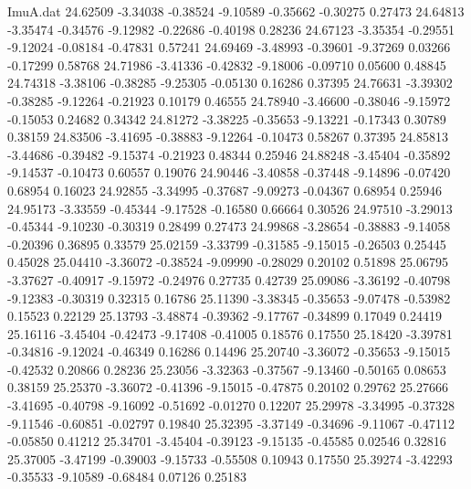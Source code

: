 \begin{filecontents}{ImuA.dat}
  24.62509   -3.34038   -0.38524   -9.10589   -0.35662   -0.30275    0.27473
  24.64813   -3.35474   -0.34576   -9.12982   -0.22686   -0.40198    0.28236
  24.67123   -3.35354   -0.29551   -9.12024   -0.08184   -0.47831    0.57241
  24.69469   -3.48993   -0.39601   -9.37269    0.03266   -0.17299    0.58768
  24.71986   -3.41336   -0.42832   -9.18006   -0.09710    0.05600    0.48845
  24.74318   -3.38106   -0.38285   -9.25305   -0.05130    0.16286    0.37395
  24.76631   -3.39302   -0.38285   -9.12264   -0.21923    0.10179    0.46555
  24.78940   -3.46600   -0.38046   -9.15972   -0.15053    0.24682    0.34342
  24.81272   -3.38225   -0.35653   -9.13221   -0.17343    0.30789    0.38159
  24.83506   -3.41695   -0.38883   -9.12264   -0.10473    0.58267    0.37395
  24.85813   -3.44686   -0.39482   -9.15374   -0.21923    0.48344    0.25946
  24.88248   -3.45404   -0.35892   -9.14537   -0.10473    0.60557    0.19076
  24.90446   -3.40858   -0.37448   -9.14896   -0.07420    0.68954    0.16023
  24.92855   -3.34995   -0.37687   -9.09273   -0.04367    0.68954    0.25946
  24.95173   -3.33559   -0.45344   -9.17528   -0.16580    0.66664    0.30526
  24.97510   -3.29013   -0.45344   -9.10230   -0.30319    0.28499    0.27473
  24.99868   -3.28654   -0.38883   -9.14058   -0.20396    0.36895    0.33579
  25.02159   -3.33799   -0.31585   -9.15015   -0.26503    0.25445    0.45028
  25.04410   -3.36072   -0.38524   -9.09990   -0.28029    0.20102    0.51898
  25.06795   -3.37627   -0.40917   -9.15972   -0.24976    0.27735    0.42739
  25.09086   -3.36192   -0.40798   -9.12383   -0.30319    0.32315    0.16786
  25.11390   -3.38345   -0.35653   -9.07478   -0.53982    0.15523    0.22129
  25.13793   -3.48874   -0.39362   -9.17767   -0.34899    0.17049    0.24419
  25.16116   -3.45404   -0.42473   -9.17408   -0.41005    0.18576    0.17550
  25.18420   -3.39781   -0.34816   -9.12024   -0.46349    0.16286    0.14496
  25.20740   -3.36072   -0.35653   -9.15015   -0.42532    0.20866    0.28236
  25.23056   -3.32363   -0.37567   -9.13460   -0.50165    0.08653    0.38159
  25.25370   -3.36072   -0.41396   -9.15015   -0.47875    0.20102    0.29762
  25.27666   -3.41695   -0.40798   -9.16092   -0.51692   -0.01270    0.12207
  25.29978   -3.34995   -0.37328   -9.11546   -0.60851   -0.02797    0.19840
  25.32395   -3.37149   -0.34696   -9.11067   -0.47112   -0.05850    0.41212
  25.34701   -3.45404   -0.39123   -9.15135   -0.45585    0.02546    0.32816
  25.37005   -3.47199   -0.39003   -9.15733   -0.55508    0.10943    0.17550
  25.39274   -3.42293   -0.35533   -9.10589   -0.68484    0.07126    0.25183

\end{filecontents}
